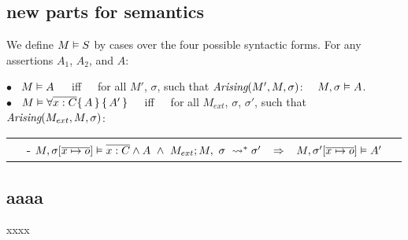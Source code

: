 \subsection{new parts for semantics}

\begin{definition}
We define $M \vDash {S}$ by cases over the four possible syntactic forms.
For any assertions   $A_1$, $A_2$, and $A$: \\

\label{def:necessity-semantics}

$\bullet$ \ $M \vDash {A}$\  \ \ iff\ \ \ for all $M'$, $\sigma$, such that $\textit{Arising}(M', M, \sigma)$: \ \  $M , \sigma \vDash A$.  \\

$\bullet$ \ $M \vDash \forall \overline{x:C} {{\{}\, A \,{\}} \,{\{}\, A' \,{\}}}$\ \ \ iff\ \  \ for all $M_{ext}$, $\sigma$, $\sigma'$, such that $\textit{Arising}(M_{ext}, M, \sigma)$: \\  

\begin{tabular}{lr}
$\;\;\;\;$- $\satisfiesA {M} {\sigma[{\overline{x\mapsto o}} ]} {\overline{x:C} \wedge A}\  \wedge \ 
\reductions{M_{ext}}{M}{\sigma}{\sigma'}
 \;\;\;\Rightarrow\;\;\; \satisfiesA{M}  {\sigma'[{\overline{x\mapsto o}} ]} {A'}$   
\end{tabular} 
\end{definition} 

\subsection{aaaa}

xxxx